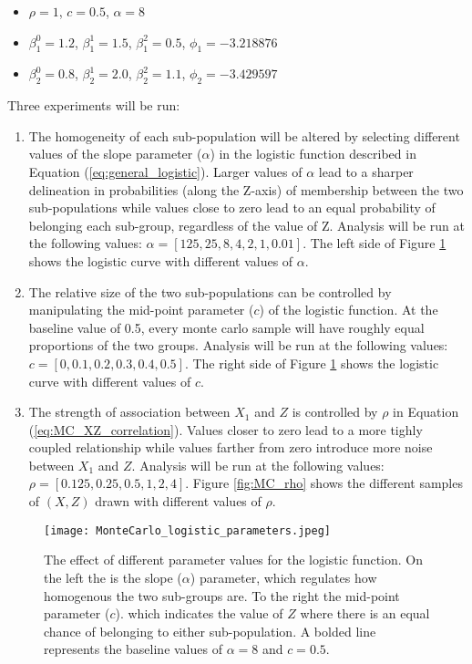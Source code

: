 \documentclass[12pt]{article}
\theoremstyle{definition}
\begin{document}
\begin{itemize}
    \item $\rho = 1$,\; $c = 0.5$,\; $\alpha = 8$
    \item $\beta_{1}^{0} = 1.2$, \; $\beta_{1}^{1} = 1.5$, \; $\beta_{1}^{2} = 0.5$, \; $\phi_{1} = -3.218876$
    \item $\beta_{2}^{0} = 0.8$, \; $\beta_{2}^{1} = 2.0$, \; $\beta_{2}^{2} = 1.1$, \; $\phi_{2} = -3.429597$
\end{itemize}

Three experiments will be run:

\begin{enumerate}
    \item The homogeneity of each sub-population will be altered by selecting different values of the slope parameter ($\alpha$) in the logistic function described in Equation (\ref{eq:general_logistic}). Larger values of $\alpha$ lead to a sharper delineation in probabilities (along the Z-axis) of membership between the two sub-populations while values close to zero lead to an equal probability of belonging each sub-group, regardless of the value of Z. Analysis will be run at the following values: $\alpha = [125, 25, 8, 4, 2, 1, 0.01]$. The left side of Figure \ref{fig:MC_logistic_pars} shows the logistic curve with different values of $\alpha$.
    
    \item The relative size of the two sub-populations can be controlled by manipulating the mid-point parameter ($c$) of the logistic function. At the baseline value of 0.5, every monte carlo sample will have roughly equal proportions of the two groups. Analysis will be run at the following values: $c = [0, 0.1, 0.2, 0.3, 0.4, 0.5]$. The right side of Figure \ref{fig:MC_logistic_pars} shows the logistic curve with different values of $c$.
  
    \item The strength of association between $X_{1}$ and $Z$ is controlled by $\rho$ in Equation (\ref{eq:MC_XZ_correlation}). Values closer to zero lead to a more tighly coupled relationship while values farther from zero introduce more noise between $X_{1}$ and $Z$. Analysis will be run at the following values: $\rho = [0.125, 0.25, 0.5, 1, 2, 4]$. Figure \ref{fig:MC_rho} shows the different samples of $(X, Z)$ drawn with different values of $\rho$.
\end{enumerate}


\begin{figure}[!ht]
  \centering
  \texttt{[image: MonteCarlo\_logistic\_parameters.jpeg]}
  \caption{The effect of different parameter values for the logistic function. On the left the is the slope ($\alpha$) parameter, which regulates how homogenous the two sub-groups are. To the right the mid-point parameter ($c$). which indicates the value of $Z$ where there is an equal chance of belonging to either sub-population. A bolded line represents the baseline values of $\alpha = 8$ and $c = 0.5$.}
  \label{fig:MC_logistic_pars}
\end{figure}
\end{document}
